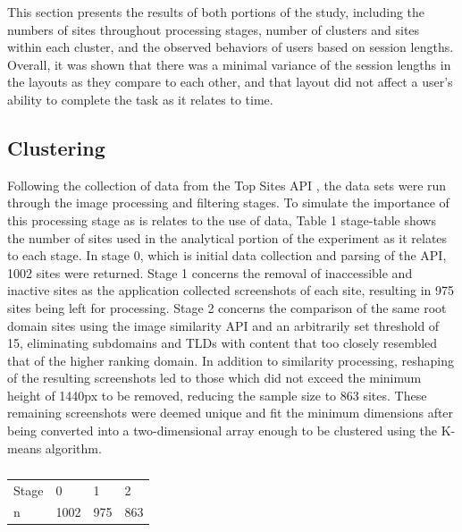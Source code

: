 \documentclass[conference]{IEEEtran}
\begin{document}
This section presents the results of both portions of the study, including the numbers of sites throughout processing stages, number of clusters and sites within each cluster, and the observed behaviors of users based on session lengths. Overall, it was shown that there was a minimal variance of the session lengths in the layouts as they compare to each other, and that layout did not affect a user's ability to complete the task as it relates to time.

\subsection{Clustering}

Following the collection of data from the Top Sites API \cite{antoniou_2015}, the data sets were run through the image processing and filtering stages. To simulate the importance of this processing stage as is relates to the use of data, Table 1 {stage-table} shows the number of sites used in the analytical portion of the experiment as it relates to each stage. In stage 0, which is initial data collection and parsing of the API, 1002 sites were returned. Stage 1 concerns the removal of inaccessible and inactive sites as the application collected screenshots of each site, resulting in 975 sites being left for processing. Stage 2 concerns the comparison of the same root domain sites using the image similarity API \cite{deepai} and an arbitrarily set threshold of 15, eliminating subdomains and TLDs with content that too closely resembled that of the higher ranking domain. In addition to similarity processing, reshaping of the resulting screenshots led to those which did not exceed the minimum height of 1440px to be removed, reducing the sample size to 863 sites. These remaining screenshots were deemed unique and fit the minimum dimensions after being converted into a two-dimensional array enough to be clustered using the K-means algorithm.


\begin{table}[]
\caption{}
\label{tab:my-table}
\begin{tabular}{@{}l|lll@{}}
\toprule
Stage & 0    & 1   & 2   \\
n     & 1002 & 975 & 863 \\ \bottomrule
\end{tabular}
\end{table}
\end{document}

